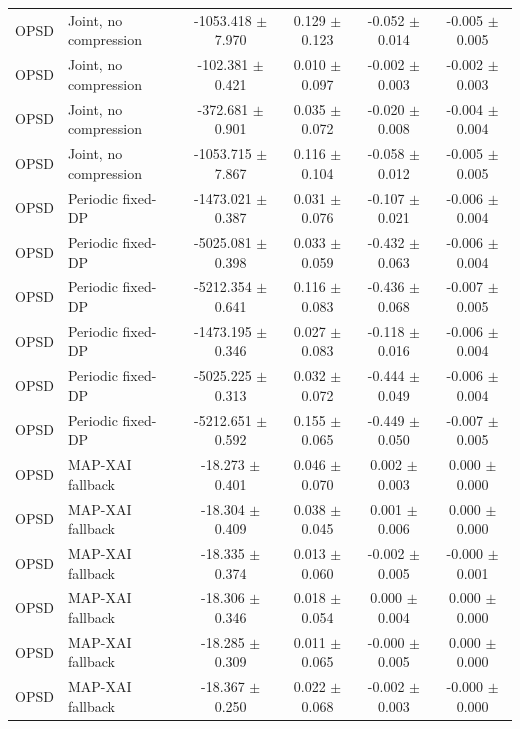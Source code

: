 \begin{table}[t]
\begin{tabular}{llcccc}
OPSD & Joint, no compression & -1053.418 $\pm$ 7.970 & 0.129 $\pm$ 0.123 & -0.052 $\pm$ 0.014 & -0.005 $\pm$ 0.005 \\
OPSD & Joint, no compression & -102.381 $\pm$ 0.421 & 0.010 $\pm$ 0.097 & -0.002 $\pm$ 0.003 & -0.002 $\pm$ 0.003 \\
OPSD & Joint, no compression & -372.681 $\pm$ 0.901 & 0.035 $\pm$ 0.072 & -0.020 $\pm$ 0.008 & -0.004 $\pm$ 0.004 \\
OPSD & Joint, no compression & -1053.715 $\pm$ 7.867 & 0.116 $\pm$ 0.104 & -0.058 $\pm$ 0.012 & -0.005 $\pm$ 0.005 \\
OPSD & Periodic fixed-DP & -1473.021 $\pm$ 0.387 & 0.031 $\pm$ 0.076 & -0.107 $\pm$ 0.021 & -0.006 $\pm$ 0.004 \\
OPSD & Periodic fixed-DP & -5025.081 $\pm$ 0.398 & 0.033 $\pm$ 0.059 & -0.432 $\pm$ 0.063 & -0.006 $\pm$ 0.004 \\
OPSD & Periodic fixed-DP & -5212.354 $\pm$ 0.641 & 0.116 $\pm$ 0.083 & -0.436 $\pm$ 0.068 & -0.007 $\pm$ 0.005 \\
OPSD & Periodic fixed-DP & -1473.195 $\pm$ 0.346 & 0.027 $\pm$ 0.083 & -0.118 $\pm$ 0.016 & -0.006 $\pm$ 0.004 \\
OPSD & Periodic fixed-DP & -5025.225 $\pm$ 0.313 & 0.032 $\pm$ 0.072 & -0.444 $\pm$ 0.049 & -0.006 $\pm$ 0.004 \\
OPSD & Periodic fixed-DP & -5212.651 $\pm$ 0.592 & 0.155 $\pm$ 0.065 & -0.449 $\pm$ 0.050 & -0.007 $\pm$ 0.005 \\
OPSD & MAP-XAI fallback & -18.273 $\pm$ 0.401 & 0.046 $\pm$ 0.070 & 0.002 $\pm$ 0.003 & 0.000 $\pm$ 0.000 \\
OPSD & MAP-XAI fallback & -18.304 $\pm$ 0.409 & 0.038 $\pm$ 0.045 & 0.001 $\pm$ 0.006 & 0.000 $\pm$ 0.000 \\
OPSD & MAP-XAI fallback & -18.335 $\pm$ 0.374 & 0.013 $\pm$ 0.060 & -0.002 $\pm$ 0.005 & -0.000 $\pm$ 0.001 \\
OPSD & MAP-XAI fallback & -18.306 $\pm$ 0.346 & 0.018 $\pm$ 0.054 & 0.000 $\pm$ 0.004 & 0.000 $\pm$ 0.000 \\
OPSD & MAP-XAI fallback & -18.285 $\pm$ 0.309 & 0.011 $\pm$ 0.065 & -0.000 $\pm$ 0.005 & 0.000 $\pm$ 0.000 \\
OPSD & MAP-XAI fallback & -18.367 $\pm$ 0.250 & 0.022 $\pm$ 0.068 & -0.002 $\pm$ 0.003 & -0.000 $\pm$ 0.000 \\
\bottomrule
\end{tabular}
\end{table}
